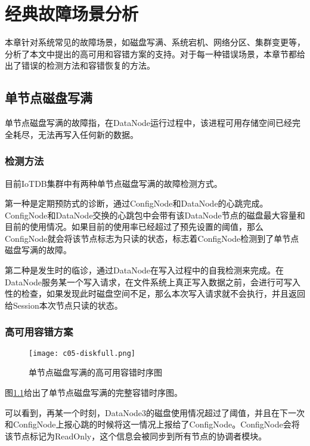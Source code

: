 
\chapter{经典故障场景分析}\label{chap-failure-scenarios}

本章针对系统常见的故障场景，如磁盘写满、系统宕机、网络分区、集群变更等，分析了本文中提出的高可用和容错方案的支持。对于每一种错误场景，本章节都给出了错误的检测方法和容错恢复的方法。


\section{单节点磁盘写满}

单节点磁盘写满的故障指，在DataNode运行过程中，该进程可用存储空间已经完全耗尽，无法再写入任何新的数据。

\subsection{检测方法}

目前IoTDB集群中有两种单节点磁盘写满的故障检测方式。

第一种是定期预防式的诊断，通过ConfigNode和DataNode的心跳完成。ConfigNode和DataNode交换的心跳包中会带有该DataNode节点的磁盘最大容量和目前的使用情况。如果目前的使用率已经超过了预先设置的阈值，那么ConfigNode就会将该节点标志为只读的状态，标志着ConfigNode检测到了单节点磁盘写满的故障。

第二种是发生时的临诊，通过DataNode在写入过程中的自我检测来完成。在DataNode服务某一个写入请求，在文件系统上真正写入数据之前，会进行可写入性的检查，如果发现此时磁盘空间不足，那么本次写入请求就不会执行，并且返回给Session本次节点只读的状态。

\subsection{高可用容错方案}

\begin{figure}
    \centering
    \texttt{[image: c05-diskfull.png]}
    \caption{单节点磁盘写满的高可用容错时序图}
    \label{fig:c05-diskfull}
  \end{figure}

图\ref{fig:c05-diskfull}给出了单节点磁盘写满的完整容错时序图。

可以看到，再某一个时刻，DataNode3的磁盘使用情况超过了阈值，并且在下一次和ConfigNode上报心跳的时候将这一情况上报给了ConfigNode。ConfigNode会将该节点标记为ReadOnly，这个信息会被同步到所有节点的协调者模块。

